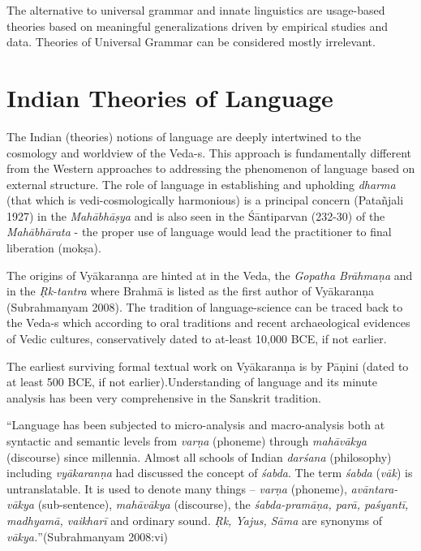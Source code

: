 The alternative to universal grammar and innate linguistics are usage-based theories based on meaningful generalizations driven by empirical studies and data. Theories of Universal Grammar can be considered mostly irrelevant. 

\vskip -26pt


\section*{Indian Theories of Language}

\vskip -6pt

The Indian (theories) notions of language are deeply intertwined to the cosmology and worldview of the Veda-s. This approach is fundamentally different from the Western approaches to addressing the phenomenon of language based on external structure. The role of language in establishing and upholding \textit{dharma} (that which is vedi-cosmologically harmonious) is a principal concern (Patañjali 1927) in the \textit{Mahābhāṣya} and is also seen in the Śāntiparvan (232-30) of the \textit{Mahābhārata} - the proper use of language would lead the practitioner to final liberation (mokṣa).

The origins of Vyākaranṇa are hinted at in the Veda, the \textit{Gopatha Brāhmaṇa} and in the \textit{Ṛk-tantra} where Brahmā is listed as the first author of Vyākaranṇa (Subrahmanyam 2008). The tradition of language-science can be traced back to the Veda-s which according to oral traditions and recent archaeological evidences of Vedic cultures, conservatively dated to at-least 10,000 BCE, if not earlier.

The earliest surviving formal textual work on Vyākaranṇa is by Pāṇini (dated to at least 500 BCE, if not earlier).Understanding of language and its minute analysis has been very comprehensive in the Sanskrit tradition.

\begin{myquote}
“Language has been subjected to micro-analysis and macro-analysis both at syntactic and semantic levels from \textit{varṇa} (phoneme) through \textit{mahāvākya} (discourse) since millennia. Almost all schools of Indian \textit{darśana} (philosophy) including \textit{vyākaranṇa} had discussed the concept of \textit{śabda}. The term \textit{śabda} (\textit{vāk}) is untranslatable. It is used to denote many things – \textit{varṇa} (phoneme), \textit{avāntara-vākya} (sub-sentence), \textit{mahāvākya} (discourse), the \textit{śabda-pramāṇa, parā, paśyantī, madhyamā, vaikharī} and ordinary sound. \textit{Ṛk, Yajus, Sāma} are synonyms of \textit{vākya.}”\hfill (Subrahmanyam 2008:vi)
\end{myquote}

